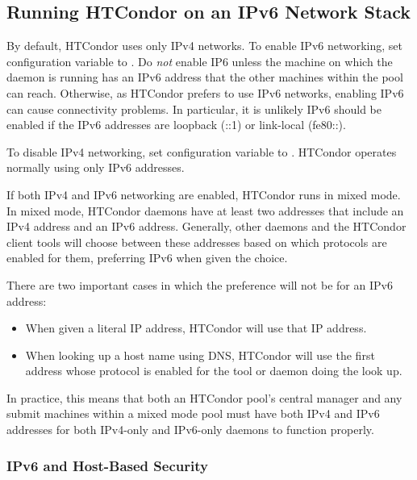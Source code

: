 \subsection{\label{sec:ipv6}Running HTCondor on an IPv6 Network Stack}

By default, HTCondor uses only IPv4 networks.  To enable IPv6 networking,
set configuration variable  to .
Do \emph{not} enable IP6 unless
the machine on which the daemon is running has an IPv6 address that the
other machines within the pool can reach.  
Otherwise, as HTCondor prefers to use IPv6 networks,
enabling IPv6 can cause connectivity problems.
In particular, it is unlikely IPv6 should be enabled if the IPv6 addresses
are loopback (::1) or link-local (fe80::).

To disable IPv4 networking, set configuration variable  
to .
HTCondor operates normally using only IPv6 addresses.

If both IPv4 and IPv6 networking are enabled, HTCondor runs in mixed mode.
In mixed mode, HTCondor daemons have at least two addresses that include
an IPv4 address and an IPv6 address.  
Generally, other daemons and the HTCondor client
tools will choose between these addresses based on which protocols are enabled
for them, preferring IPv6 when given the choice.

There are two important cases in which the preference will not be for an IPv6 address:
\begin{itemize}
\item{When given a literal IP address, HTCondor will use that IP address.  }
\item{When looking up a host name using DNS,
HTCondor will use the first address whose
protocol is enabled for the tool or daemon doing the look up.  }
\end{itemize}

In practice, this means that both an HTCondor pool's central manager
and any submit machines within a mixed mode pool must have both IPv4 and IPv6
addresses for both IPv4-only and IPv6-only  daemons 
to function properly.

\subsubsection{IPv6 and Host-Based Security}

